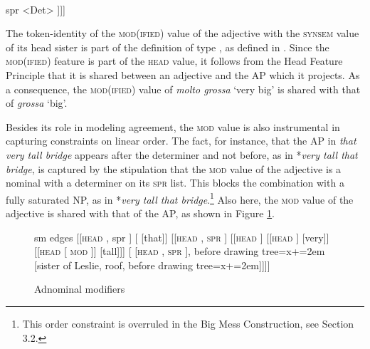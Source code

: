 \documentclass[output=paper
                ,modfonts
                ,nonflat
	        ,collection
	        ,collectionchapter
	        ,collectiontoclongg
 	        ,biblatex
                ,babelshorthands
                ,newtxmath
                ,draftmode
                ,colorlinks, citecolor=brown
]{./langsci/langscibook}
\begin{document}
\begin{exe} 
\ex\label{rd}
\begin{avm}
[\type{category}                              \\
 head [\type{adjective}                         \\
       mod|loc|cat [head [\type{noun}          \\
                          number \type{sing} \\
                          gender \type{fem}] \\
                    spr <Det> ]]]
\end{avm}
\end{exe}

\noindent
The token-identity of the \textsc{mod(ified)} value of the adjective
with the \textsc{synsem} value of its head sister is part of the 
definition of type , as defined in . 
Since the \textsc{mod(ified)} feature is part of the \textsc{head} value, it follows from the 
Head Feature Principle that it is shared between an adjective 
and the AP which it projects. As a consequence, the \textsc{mod(ified)} value of 
\emph{molto grossa} `very big' is shared with that of \emph{grossa} `big'. 
 
Besides its role in modeling agreement, the \textsc{mod} value is also instrumental 
in capturing constraints on linear order.  
The fact, for instance, that the AP in \emph{that very tall bridge} appears 
after the determiner and not before, as in *\emph{very tall that bridge},
is captured by the stipulation that the \textsc{mod} value of the adjective 
is a nominal with a determiner on its \textsc{spr} list. This blocks the 
combination with a fully saturated NP, as in 
*\emph{very tall that bridge}.\footnote{This order constraint is overruled in 
the Big Mess Construction, see Section 3.2.} Also here, the \textsc{mod} value of 
the adjective is shared with that of the AP, as shown in Figure \ref{lea}. 

\begin{figure}
	\centering
	\begin{forest}
sm edges
[{[\textsc{head}  , {\sc spr} \eliste]}
	[ [that]]
	[{[\textsc{head} , \textsc{spr} ]}
		[{[\textsc{head} ]}
			[{[\textsc{head} ]} [very]]
			[{[\textsc{head}  [ \textsc{mod} ]]} [tall]]]
		[{ [\textsc{head} , \textsc{spr} ]}, before drawing tree={x+=2em} [sister of Leslie, roof, before drawing tree={x+=2em}]]]]
	\end{forest}
	\caption{\label{lea} Adnominal modifiers}
\end{figure}
 
\end{document}
